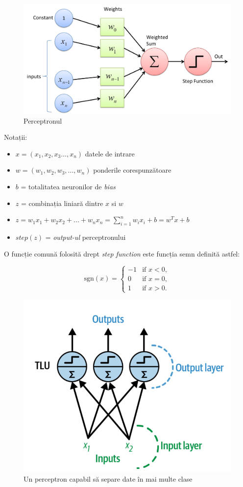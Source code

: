 \begin{figure}[h]
         \centering 
         \includegraphics[width=.85\textwidth]{images/the-perceptron.jpg}
         \captionsetup{font=footnotesize}
         \caption{Perceptronul \cite{the-perecptron}}
\end{figure}
\newpage
Notații:

\begin{itemize}
    \item $x = (x_1, x_2, x_3... , x_n)$ datele de intrare
    \item $w = (w_1, w_2, w_3,..., w_n)$ ponderile corespunzătoare 
    \item $b$ = totalitatea neuronilor de \textit{bias} 
    \item $z$ = combinația liniară dintre $x$ si $w$
    \item $z = w_1 x_1 + w_2 x_2 + ... + w_n x_n  = \sum_{i=1}^{n} w_i x_i + b = w^{T}x + b$
    \item $step(z)$ = \textit{output-ul} perceptronului
\end{itemize}
 
O funcție comună folosită drept \textit{step function} este funcția semn definită astfel: 

\[
\text{sgn}(x) = 
\begin{cases} 
    -1 & \text{if } x < 0, \\
    0 & \text{if } x = 0, \\
    1 & \text{if } x > 0.
\end{cases}
\]    

\begin{figure}[h]
         \centering 
         \includegraphics[width=.5\linewidth]{images/multiclass-perceptron.png}
         \captionsetup{font=footnotesize}
         \caption{Un perceptron capabil să separe date în mai multe clase \cite{ageron2019}}
         \label{Figura 2.4}
\end{figure}
\newpage

